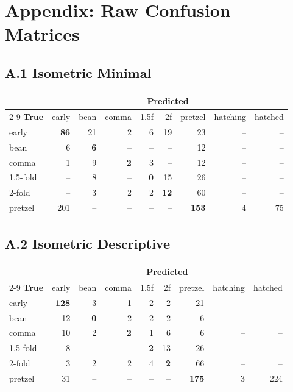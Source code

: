 \documentclass[11pt, a4paper]{article}
\begin{document}
\section*{Appendix: Raw Confusion Matrices}

\subsection*{A.1 Isometric Minimal}

\begin{center}
\small
\begin{tabular}{@{}l*{8}{r}@{}}
\toprule
& \multicolumn{8}{c}{\textbf{Predicted}} \\
\cmidrule(l){2-9}
\textbf{True} & early & bean & comma & 1.5f & 2f & pretzel & hatching & hatched \\
\midrule
early    & \textbf{86} & 21 & 2 & 6 & 19 & 23 & -- & -- \\
bean     & 6 & \textbf{6} & -- & -- & -- & 12 & -- & -- \\
comma    & 1 & 9 & \textbf{2} & 3 & -- & 12 & -- & -- \\
1.5-fold & -- & 8 & -- & \textbf{0} & 15 & 26 & -- & -- \\
2-fold   & -- & 3 & 2 & 2 & \textbf{12} & 60 & -- & -- \\
pretzel  & 201 & -- & -- & -- & -- & \textbf{153} & 4 & 75 \\
\bottomrule
\end{tabular}
\end{center}

\subsection*{A.2 Isometric Descriptive}

\begin{center}
\small
\begin{tabular}{@{}l*{8}{r}@{}}
\toprule
& \multicolumn{8}{c}{\textbf{Predicted}} \\
\cmidrule(l){2-9}
\textbf{True} & early & bean & comma & 1.5f & 2f & pretzel & hatching & hatched \\
\midrule
early    & \textbf{128} & 3 & 1 & 2 & 2 & 21 & -- & -- \\
bean     & 12 & \textbf{0} & 2 & 2 & 2 & 6 & -- & -- \\
comma    & 10 & 2 & \textbf{2} & 1 & 6 & 6 & -- & -- \\
1.5-fold & 8 & -- & -- & \textbf{2} & 13 & 26 & -- & -- \\
2-fold   & 3 & 2 & 2 & 4 & \textbf{2} & 66 & -- & -- \\
pretzel  & 31 & -- & -- & -- & -- & \textbf{175} & 3 & 224 \\
\bottomrule
\end{tabular}
\end{center}
\end{document}
